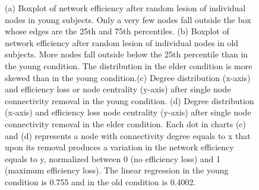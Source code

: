 \documentclass[12pt,a4paper]{article}
\begin{document}
\begin{figure}[!ht]
{    }
    \caption{\small (a) Boxplot of network efficiency after random lesion of individual nodes in young subjects. Only a very few nodes fall outside the box whose edges are the 25th and 75th percentiles. \small (b) Boxplot of network efficiency after random lesion of individual nodes  in old subjects. More nodes fall outside below the 25th percentile than in the young condition. The distribution in the elder condition is more skewed than in the young condition.\small (c) Degree distribution (x-axis) and efficiency loss or node centrality (y-axis) after single node connectivity removal in the young condition.  
  \small (d)  Degree distribution (x-axis) and efficiency loss node centrality (y-axis) after single node connectivity removal in the elder condition. Each dot in charts \small (c) and \small (d) represents a node with connectivity degree equals to x that upon its removal produces a variation in the network efficiency equals to y, normalized between 0 (no efficiency loss) and 1 (maximum efficiency loss). The linear regression in the young condition is 0.755 and in the old condition is 0.4002.}
    \label{fig:boxplot}
  \end{figure}
\end{document}

